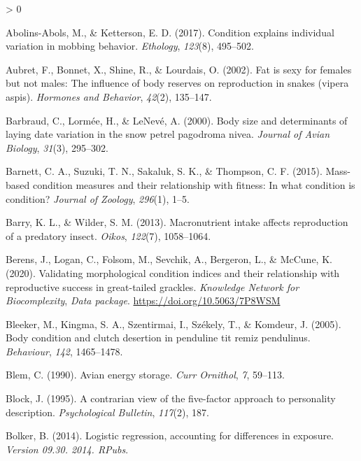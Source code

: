 \documentclass[
]{article}
\newlength{\cslhangindent}
\newenvironment{CSLReferences}[2] %
 {%
  \setlength{\parindent}{0pt}
  \ifodd #1 \everypar{\setlength{\hangindent}{\cslhangindent}}\ignorespaces\fi
  \ifnum #2 > 0
  \setlength{\parskip}{#2\baselineskip}
  \fi
 }%
 {}
\begin{document}
\hypertarget{refs}{}
\begin{CSLReferences}{1}{0}
\leavevmode\hypertarget{ref-abolins2017condition}{}%
Abolins-Abols, M., \& Ketterson, E. D. (2017). Condition explains
individual variation in mobbing behavior. \emph{Ethology},
\emph{123}(8), 495--502.

\leavevmode\hypertarget{ref-aubret2002fat}{}%
Aubret, F., Bonnet, X., Shine, R., \& Lourdais, O. (2002). Fat is sexy
for females but not males: The influence of body reserves on
reproduction in snakes (vipera aspis). \emph{Hormones and Behavior},
\emph{42}(2), 135--147.

\leavevmode\hypertarget{ref-barbraud2000body}{}%
Barbraud, C., Lormée, H., \& LeNevé, A. (2000). Body size and
determinants of laying date variation in the snow petrel pagodroma
nivea. \emph{Journal of Avian Biology}, \emph{31}(3), 295--302.

\leavevmode\hypertarget{ref-barnett2015mass}{}%
Barnett, C. A., Suzuki, T. N., Sakaluk, S. K., \& Thompson, C. F.
(2015). Mass-based condition measures and their relationship with
fitness: In what condition is condition? \emph{Journal of Zoology},
\emph{296}(1), 1--5.

\leavevmode\hypertarget{ref-barry2013macronutrient}{}%
Barry, K. L., \& Wilder, S. M. (2013). Macronutrient intake affects
reproduction of a predatory insect. \emph{Oikos}, \emph{122}(7),
1058--1064.

\leavevmode\hypertarget{ref-berens2020conditiondata}{}%
Berens, J., Logan, C., Folsom, M., Sevchik, A., Bergeron, L., \& McCune,
K. (2020). Validating morphological condition indices and their
relationship with reproductive success in great-tailed grackles.
\emph{Knowledge Network for Biocomplexity}, \emph{Data package}.
\url{https://doi.org/10.5063/7P8WSM}

\leavevmode\hypertarget{ref-bleeker2005body}{}%
Bleeker, M., Kingma, S. A., Szentirmai, I., Székely, T., \& Komdeur, J.
(2005). Body condition and clutch desertion in penduline tit remiz
pendulinus. \emph{Behaviour}, \emph{142}, 1465--1478.

\leavevmode\hypertarget{ref-blem1990avian}{}%
Blem, C. (1990). Avian energy storage. \emph{Curr Ornithol}, \emph{7},
59--113.

\leavevmode\hypertarget{ref-block1995contrarian}{}%
Block, J. (1995). A contrarian view of the five-factor approach to
personality description. \emph{Psychological Bulletin}, \emph{117}(2),
187.

\leavevmode\hypertarget{ref-bolker2014logistic}{}%
Bolker, B. (2014). Logistic regression, accounting for differences in
exposure. \emph{Version 09.30. 2014. RPubs}.


\end{CSLReferences}
\end{document}
